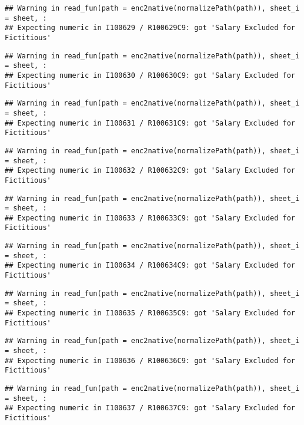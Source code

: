 \documentclass[
]{article}
\begin{document}
\begin{verbatim}
## Warning in read_fun(path = enc2native(normalizePath(path)), sheet_i = sheet, :
## Expecting numeric in I100629 / R100629C9: got 'Salary Excluded for Fictitious'
\end{verbatim}

\begin{verbatim}
## Warning in read_fun(path = enc2native(normalizePath(path)), sheet_i = sheet, :
## Expecting numeric in I100630 / R100630C9: got 'Salary Excluded for Fictitious'
\end{verbatim}

\begin{verbatim}
## Warning in read_fun(path = enc2native(normalizePath(path)), sheet_i = sheet, :
## Expecting numeric in I100631 / R100631C9: got 'Salary Excluded for Fictitious'
\end{verbatim}

\begin{verbatim}
## Warning in read_fun(path = enc2native(normalizePath(path)), sheet_i = sheet, :
## Expecting numeric in I100632 / R100632C9: got 'Salary Excluded for Fictitious'
\end{verbatim}

\begin{verbatim}
## Warning in read_fun(path = enc2native(normalizePath(path)), sheet_i = sheet, :
## Expecting numeric in I100633 / R100633C9: got 'Salary Excluded for Fictitious'
\end{verbatim}

\begin{verbatim}
## Warning in read_fun(path = enc2native(normalizePath(path)), sheet_i = sheet, :
## Expecting numeric in I100634 / R100634C9: got 'Salary Excluded for Fictitious'
\end{verbatim}

\begin{verbatim}
## Warning in read_fun(path = enc2native(normalizePath(path)), sheet_i = sheet, :
## Expecting numeric in I100635 / R100635C9: got 'Salary Excluded for Fictitious'
\end{verbatim}

\begin{verbatim}
## Warning in read_fun(path = enc2native(normalizePath(path)), sheet_i = sheet, :
## Expecting numeric in I100636 / R100636C9: got 'Salary Excluded for Fictitious'
\end{verbatim}

\begin{verbatim}
## Warning in read_fun(path = enc2native(normalizePath(path)), sheet_i = sheet, :
## Expecting numeric in I100637 / R100637C9: got 'Salary Excluded for Fictitious'
\end{verbatim}
\end{document}
